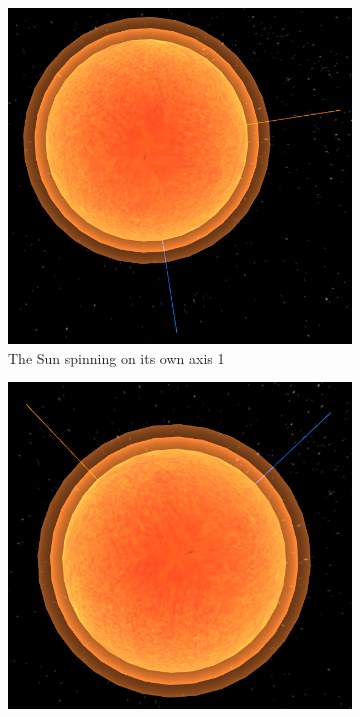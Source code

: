 \documentclass[12pt]{article}
\begin{document}
\begin{figure}[H]
        \centering
        \begin{subfigure}[b]{0.4\textwidth}
                \includegraphics[width=\textwidth]{images/sunaxialrotation1}
                \caption{The Sun spinning on its own axis 1}
                \label{fig: The axial spin of the Sun.}
       \end{subfigure}
        \begin{subfigure}[b]{0.4\textwidth}
                \includegraphics[width=\textwidth]{images/sunaxialrotation2}

\end{subfigure}
\end{figure}
\end{document}
